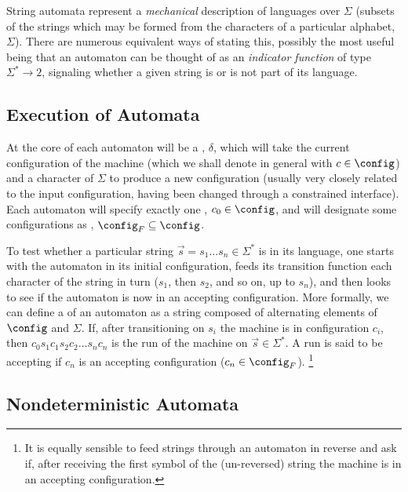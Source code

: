String automata represent a {\em mechanical} description of languages over
$\Sigma$ (\ie subsets of the strings which may be formed from the
characters of a particular alphabet, $\Sigma$).  There are numerous
equivalent ways of stating this, possibly the most useful being that an
automaton can be thought of as an {\em indicator function} of type $\Sigma^*
\to 2$, signaling whether a given string is or is not part of its language.

\subsection{Execution of Automata}

At the core of each automaton will be a ,
$\delta$, which will take the current configuration of the machine (which we
shall denote in general with $c \in \config$) and a character of $\Sigma$ to
produce a new configuration (usually very closely related to the input
configuration, having been changed through a constrained interface).  Each
automaton will specify exactly one , $c_0 \in
\config$, and will designate some configurations as , $\config_F \subseteq \config$.

To test whether a particular string $\vec{s} = s_1 \ldots s_n \in \Sigma^*$
is in its language, one starts with the automaton in its initial
configuration, feeds its transition function each character of the string in
turn (\ie $s_1$, then $s_2$, and so on, up to $s_n$), and then looks to see
if the automaton is now in an accepting configuration.  More formally, we
can define a  of an automaton as a string composed of alternating
elements of $\config$ and $\Sigma$.  If, after transitioning on $s_i$ the
machine is in configuration $c_i$, then $c_0 s_1 c_1 s_2 c_2 \ldots s_n c_n$
is the run of the machine on $\vec{s} \in \Sigma^*$.  A run is said to be
accepting if $c_n$ is an accepting configuration (\ie $c_n \in \config_F$).%
%
\footnote{It is equally sensible to feed strings through an automaton in
reverse and ask if, after receiving the first symbol of the (un-reversed)
string the machine is in an accepting configuration.}

\subsection{Nondeterministic Automata}


